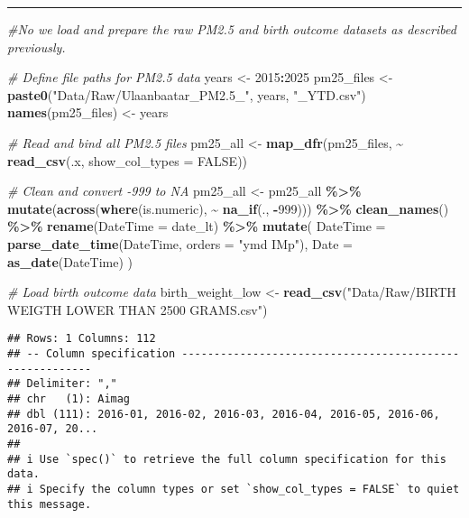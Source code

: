 \documentclass[
]{article}
\newenvironment{Shaded}{\begin{snugshade}}{\end{snugshade}}
\newcommand{\AttributeTok}[1]{\textcolor[rgb]{0.13,0.29,0.53}{#1}}
\newcommand{\CommentTok}[1]{\textcolor[rgb]{0.56,0.35,0.01}{\textit{#1}}}
\newcommand{\ConstantTok}[1]{\textcolor[rgb]{0.56,0.35,0.01}{#1}}
\newcommand{\DecValTok}[1]{\textcolor[rgb]{0.00,0.00,0.81}{#1}}
\newcommand{\FunctionTok}[1]{\textcolor[rgb]{0.13,0.29,0.53}{\textbf{#1}}}
\newcommand{\NormalTok}[1]{#1}
\newcommand{\OtherTok}[1]{\textcolor[rgb]{0.56,0.35,0.01}{#1}}
\newcommand{\SpecialCharTok}[1]{\textcolor[rgb]{0.81,0.36,0.00}{\textbf{#1}}}
\newcommand{\StringTok}[1]{\textcolor[rgb]{0.31,0.60,0.02}{#1}}
\begin{document}
\begin{center}\rule{0.5\linewidth}{0.5pt}\end{center}

\begin{Shaded}
\begin{Highlighting}[]
\CommentTok{\#No we load and prepare the raw PM2.5 and birth outcome datasets as described previously.}

\CommentTok{\# Define file paths for PM2.5 data}
\NormalTok{years }\OtherTok{\textless{}{-}} \DecValTok{2015}\SpecialCharTok{:}\DecValTok{2025}
\NormalTok{pm25\_files }\OtherTok{\textless{}{-}} \FunctionTok{paste0}\NormalTok{(}\StringTok{"Data/Raw/Ulaanbaatar\_PM2.5\_"}\NormalTok{, years, }\StringTok{"\_YTD.csv"}\NormalTok{)}
\FunctionTok{names}\NormalTok{(pm25\_files) }\OtherTok{\textless{}{-}}\NormalTok{ years}

\CommentTok{\# Read and bind all PM2.5 files}
\NormalTok{pm25\_all }\OtherTok{\textless{}{-}} \FunctionTok{map\_dfr}\NormalTok{(pm25\_files, }\SpecialCharTok{\textasciitilde{}} \FunctionTok{read\_csv}\NormalTok{(.x, }\AttributeTok{show\_col\_types =} \ConstantTok{FALSE}\NormalTok{))}

\CommentTok{\# Clean and convert {-}999 to NA}
\NormalTok{pm25\_all }\OtherTok{\textless{}{-}}\NormalTok{ pm25\_all }\SpecialCharTok{\%\textgreater{}\%}
  \FunctionTok{mutate}\NormalTok{(}\FunctionTok{across}\NormalTok{(}\FunctionTok{where}\NormalTok{(is.numeric), }\SpecialCharTok{\textasciitilde{}} \FunctionTok{na\_if}\NormalTok{(., }\SpecialCharTok{{-}}\DecValTok{999}\NormalTok{))) }\SpecialCharTok{\%\textgreater{}\%}
  \FunctionTok{clean\_names}\NormalTok{() }\SpecialCharTok{\%\textgreater{}\%}
  \FunctionTok{rename}\NormalTok{(}\AttributeTok{DateTime =}\NormalTok{ date\_lt) }\SpecialCharTok{\%\textgreater{}\%}
  \FunctionTok{mutate}\NormalTok{(}
    \AttributeTok{DateTime =} \FunctionTok{parse\_date\_time}\NormalTok{(DateTime, }\AttributeTok{orders =} \StringTok{"ymd IMp"}\NormalTok{),}
    \AttributeTok{Date     =} \FunctionTok{as\_date}\NormalTok{(DateTime)}
\NormalTok{  )}

\CommentTok{\# Load birth outcome data}
\NormalTok{birth\_weight\_low }\OtherTok{\textless{}{-}} \FunctionTok{read\_csv}\NormalTok{(}\StringTok{"Data/Raw/BIRTH WEIGTH LOWER THAN 2500 GRAMS.csv"}\NormalTok{)}
\end{Highlighting}
\end{Shaded}

\begin{verbatim}
## Rows: 1 Columns: 112
## -- Column specification --------------------------------------------------------
## Delimiter: ","
## chr   (1): Aimag
## dbl (111): 2016-01, 2016-02, 2016-03, 2016-04, 2016-05, 2016-06, 2016-07, 20...
## 
## i Use `spec()` to retrieve the full column specification for this data.
## i Specify the column types or set `show_col_types = FALSE` to quiet this message.
\end{verbatim}
\end{document}
